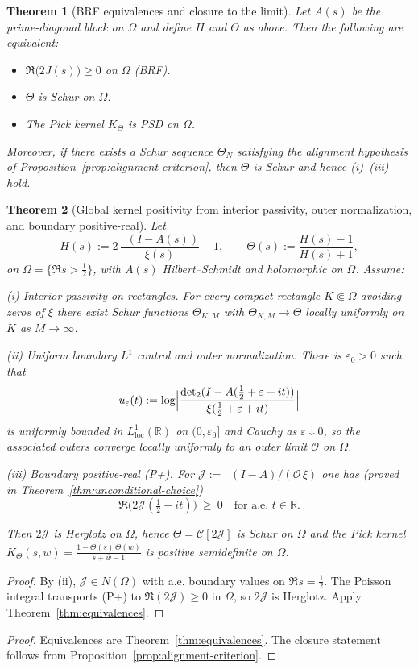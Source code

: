 \documentclass[11pt]{article}
\newtheorem{theorem}{Theorem}
\theoremstyle{definition}
\theoremstyle{remark}
\newcommand{\R}{\mathbb{R}}
\DeclareMathOperator{\dettwo}{det_2}
\begin{document}
\begin{theorem}[BRF equivalences and closure to the limit]\label{thm:BRF}
Let \(A(s)\) be the prime-diagonal block on \(\Omega\) and define \(H\) and \(\Theta\) as above. Then the following are equivalent:
\begin{itemize}
\item[(i)] \(\Re\big(2J(s)\big)\ge 0\) on \(\Omega\) (BRF).
 \item[(ii)] \(\Theta\) is Schur on \(\Omega\).
 \item[(iii)] The Pick kernel \(K_\Theta\) is PSD on \(\Omega\).
\end{itemize}
Moreover, if there exists a Schur sequence \(\Theta_N\) satisfying the alignment hypothesis of Proposition~\ref{prop:alignment-criterion}, then \(\Theta\) is Schur and hence (i)--(iii) hold.
\end{theorem}

\begin{theorem}[Global kernel positivity from interior passivity, outer normalization, and boundary positive-real]\label{thm:global-PSD}
Let
\[
  H(s):=2\,\frac{\dettwo(I-A(s))}{\xi(s)}-1,\qquad
  \Theta(s):=\frac{H(s)-1}{H(s)+1},
\]
on \(\Omega=\{\Re s>\tfrac12\}\), with $A(s)$ Hilbert--Schmidt and holomorphic on \(\Omega\).
Assume:

\emph{(i) Interior passivity on rectangles.} For every compact rectangle $K\Subset\Omega$ avoiding zeros of \(\xi\) there exist Schur functions \(\Theta_{K,M}\) with \(\Theta_{K,M}\to\Theta\) locally uniformly on $K$ as $M\to\infty$.

\emph{(ii) Uniform boundary $L^1$ control and outer normalization.} There is \(\varepsilon_0>0\) such that
\[
  u_\varepsilon(t):=\log\Bigl|\frac{\dettwo(I-A(\tfrac12+\varepsilon+it))}{\xi(\tfrac12+\varepsilon+it)}\Bigr|
\]
is uniformly bounded in $L^1_{\mathrm{loc}}(\R)$ on $(0,\varepsilon_0]$ and Cauchy as \(\varepsilon\downarrow0\), so the associated outers converge locally uniformly to an outer limit \(\mathcal O\) on \(\Omega\).

\emph{(iii) Boundary positive-real (P+).} For \(\mathcal J:=\dettwo(I-A)/(\mathcal O\,\xi)\) one has (proved in Theorem~\ref{thm:unconditional-choice})
\[
 \Re\big(2\mathcal J(\tfrac12+it)\big)\ \ge\ 0\quad\text{for a.e. }t\in\R.
\]

Then \(2\mathcal J\) is Herglotz on \(\Omega\), hence \(\Theta=\mathcal C[2\mathcal J]\) is Schur on \(\Omega\) and the Pick kernel
\(
  K_\Theta(s,w)=\frac{1-\Theta(s)\,\overline{\Theta(w)}}{s+\overline{w}-1}
\)
is positive semidefinite on \(\Omega\).
\end{theorem}
\begin{proof}
By (ii), \(\mathcal J\in N(\Omega)\) with a.e. boundary values on \(\Re s=\tfrac12\). The Poisson integral transports (P+) to \(\Re(2\mathcal J)\ge0\) in \(\Omega\), so \(2\mathcal J\) is Herglotz. Apply Theorem~\ref{thm:equivalences}.
\end{proof}
\begin{proof}
Equivalences are Theorem~\ref{thm:equivalences}. The closure statement follows from Proposition~\ref{prop:alignment-criterion}.
\end{proof}
\end{document}

